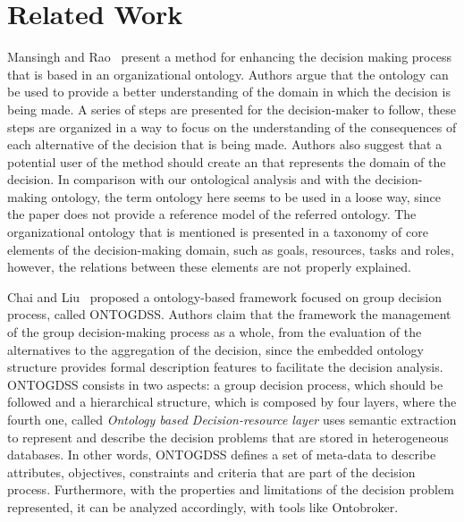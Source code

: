 \section{Related Work}
\label{sec-relatedwork}

Mansingh and Rao~\cite{mansingh2014enhancing} present a method for enhancing the decision making process that is based in an organizational ontology. Authors argue that the ontology can be used to provide a better understanding of the domain in which the decision is being made. A series of steps are presented for the decision-maker to follow, these steps are organized in a way to focus on the understanding of the consequences of each alternative of the decision that is being made. Authors also suggest that a potential user of the method should create an that represents the domain of the decision.  In comparison with our ontological analysis and with the decision-making ontology, the term ontology here seems to be used in a loose way, since the paper does not provide a reference model of the referred ontology. The organizational ontology that is mentioned is presented in a taxonomy of core elements of the decision-making domain, such as goals, resources, tasks and roles, however, the relations between these elements are not properly explained. 

Chai and Liu~\cite{chai2010ontology} proposed a ontology-based framework focused on group decision process, called ONTOGDSS. Authors claim that the framework the management of the group decision-making process as a whole, from the evaluation of the alternatives to the aggregation of the decision, since the embedded ontology structure provides formal description features to facilitate the decision analysis. ONTOGDSS consists in two aspects: a group decision process, which should be followed and a hierarchical structure, which is composed by four layers, where the fourth one, called \textit{Ontology based Decision-resource layer} uses semantic extraction to represent and describe the decision problems that are stored in heterogeneous databases. In other words, ONTOGDSS defines a set of meta-data to describe attributes, objectives, constraints and criteria that are part of the decision process. Furthermore, with the properties and limitations of the decision problem represented, it can be analyzed accordingly, with tools like Ontobroker.
